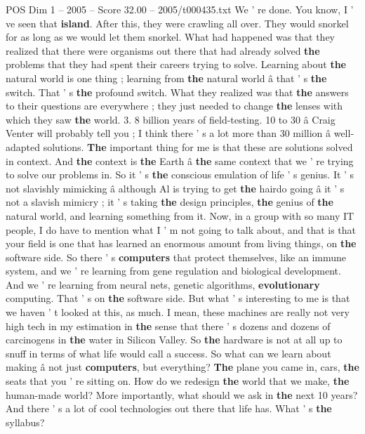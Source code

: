 \begin{textsample}{POS Dim 1 – 2005 – Score 32.00 – 2005/t000435.txt}
We ' re done.
You know, I ' ve seen that \textbf{island}.
After this, they were crawling all over.
They would snorkel for as long as we would let them snorkel.
What had happened was that they realized that there were organisms out there that had already solved \textbf{the} problems that they had spent their careers trying to solve.
Learning about \textbf{the} natural world is one thing ; learning from \textbf{the} natural world â that ' s \textbf{the} switch.
That ' s \textbf{the} profound switch.
What they realized was that \textbf{the} answers to their questions are everywhere ; they just needed to change \textbf{the} lenses with which they saw \textbf{the} world. 3. 8 billion years of field-testing. 10 to 30 â Craig Venter will probably tell you ; I think there ' s a lot more than 30 million â well-adapted solutions. \textbf{The} important thing for me is that these are solutions solved in context.
And \textbf{the} context is \textbf{the} Earth â \textbf{the} same context that we ' re trying to solve our problems in.
So it ' s \textbf{the} conscious emulation of life ' s genius.
It ' s not slavishly mimicking â although Al is trying to get \textbf{the} hairdo going â it ' s not a slavish mimicry ; it ' s taking \textbf{the} design principles, \textbf{the} genius of \textbf{the} natural world, and learning something from it.
Now, in a group with so many IT people, I do have to mention what I ' m not going to talk about, and that is that your field is one that has learned an enormous amount from living things, on \textbf{the} software side.
So there ' s \textbf{computers} that protect themselves, like an immune system, and we ' re learning from gene regulation and biological development.
And we ' re learning from neural nets, genetic algorithms, \textbf{evolutionary} computing.
That ' s on \textbf{the} software side.
But what ' s interesting to me is that we haven ' t looked at this, as much.
I mean, these machines are really not very high tech in my estimation in \textbf{the} sense that there ' s dozens and dozens of carcinogens in \textbf{the} water in Silicon Valley.
So \textbf{the} hardware is not at all up to snuff in terms of what life would call a success.
So what can we learn about making â not just \textbf{computers}, but everything? \textbf{The} plane you came in, cars, \textbf{the} seats that you ' re sitting on.
How do we redesign \textbf{the} world that we make, \textbf{the} human-made world?
More importantly, what should we ask in \textbf{the} next 10 years?
And there ' s a lot of cool technologies out there that life has.
What ' s \textbf{the} syllabus?

\end{textsample}

